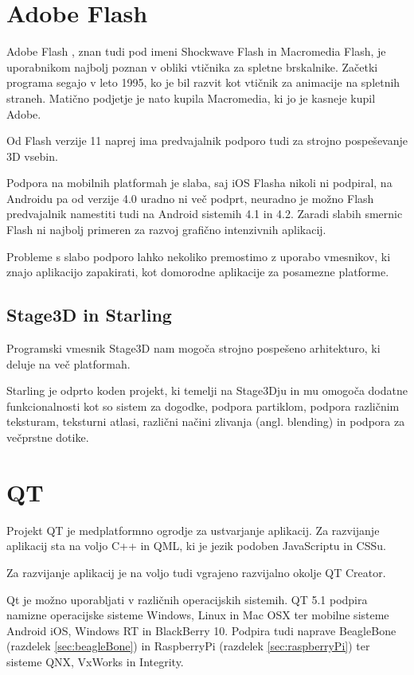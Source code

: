 \section{Adobe Flash}

Adobe Flash \cite{flash}, znan tudi pod imeni Shockwave Flash in Macromedia Flash, je uporabnikom najbolj poznan v obliki vtičnika za spletne brskalnike. Začetki programa segajo v leto 1995, ko je bil razvit kot vtičnik za animacije na spletnih straneh. Matično podjetje je nato kupila Macromedia, ki jo je kasneje kupil Adobe.   

Od Flash verzije 11 naprej ima predvajalnik podporo tudi za strojno pospeševanje 3D vsebin.

Podpora na mobilnih platformah je slaba, saj iOS Flasha nikoli ni podpiral, na Androidu pa od verzije 4.0 uradno ni več podprt, neuradno je možno Flash predvajalnik namestiti tudi na Android sistemih 4.1 in 4.2. Zaradi slabih smernic Flash ni najbolj primeren za razvoj grafično intenzivnih aplikacij.

Probleme s slabo podporo lahko nekoliko premostimo z uporabo vmesnikov, ki znajo aplikacijo zapakirati, kot domorodne aplikacije za posamezne platforme.

\subsection{Stage3D in Starling}

Programski vmesnik Stage3D nam mogoča strojno pospešeno arhitekturo, ki deluje na več platformah. 

Starling je odprto koden projekt, ki temelji na Stage3Dju in mu omogoča dodatne funkcionalnosti kot so sistem za dogodke, podpora partiklom, podpora različnim teksturam, teksturni atlasi, različni načini zlivanja (angl. blending) in podpora za večprstne dotike.

\section{QT}
\label{sec:qt}

Projekt QT je medplatformno ogrodje za ustvarjanje aplikacij. Za razvijanje aplikacij sta na voljo C++ in QML, ki je jezik podoben JavaScriptu in CSSu.

Za razvijanje aplikacij je na voljo tudi vgrajeno razvijalno okolje QT Creator.

Qt je možno uporabljati v različnih operacijskih sistemih. QT 5.1 podpira namizne operacijske sisteme Windows, Linux in Mac OSX ter mobilne sisteme Android iOS, Windows RT in BlackBerry 10. Podpira tudi naprave BeagleBone (razdelek \ref{sec:beagleBone}) in RaspberryPi (razdelek \ref{sec:raspberryPi}) ter sisteme QNX, VxWorks in Integrity.
